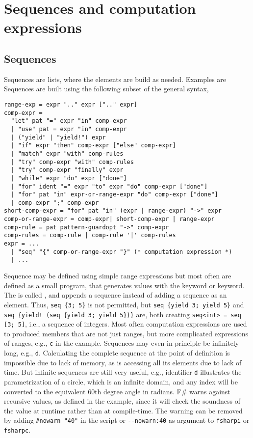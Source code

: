 \documentclass[fsharpNotes.tex]{subfiles}
\begin{document}
\chapter{Sequences and computation expressions}
\label{chap:sequences}
\section{Sequences}
\label{sec:sequences}
Sequences are lists, where the elements are build as needed. Examples are
%
%
Sequences are built using the following subset of the general syntax,
\begin{lstlisting}[language=ebnf]
range-exp = expr ".." expr [".." expr]
comp-expr =
  "let" pat "=" expr "in" comp-expr
  | "use" pat = expr "in" comp-expr
  | ("yield" | "yield!") expr
  | "if" expr "then" comp-expr ["else" comp-expr]
  | "match" expr "with" comp-rules
  | "try" comp-expr "with" comp-rules
  | "try" comp-expr "finally" expr
  | "while" expr "do" expr ["done"]
  | "for" ident "=" expr "to" expr "do" comp-expr ["done"]
  | "for" pat "in" expr-or-range-expr "do" comp-expr ["done"]
  | comp-expr ";" comp-expr
short-comp-expr = "for" pat "in" (expr | range-expr) "->" expr
comp-or-range-expr = comp-expr| short-comp-expr | range-expr
comp-rule = pat pattern-guardopt "->" comp-expr
comp-rules = comp-rule | comp-rule '|' comp-rules
expr = ... 
  | "seq" "{" comp-or-range-expr "}" (* computation expression *)
  | ...
\end{lstlisting}
%
Sequence may be defined using simple range expressions but most often are defined as a small program, that generates values with the  keyword or  keyword. The  is called , and appends a sequence instead of adding a sequence as an element. Thus, \lstinline!seq {3; 5}! is not permitted, but \lstinline!seq {yield 3; yield 5}! and \lstinline|seq {yield! (seq {yield 3; yield 5})}| are, both creating \lstinline!seq<int> = seq [3; 5]!, i.e., a sequence of integers. Most often computation expressions are used to produced members that are not just ranges, but more complicated expressions of ranges, e.g., \lstinline!c! in the example. Sequences may even in principle be infinitely long, e.g., \lstinline!d!. Calculating the complete sequence at the point of definition is impossible due to lack of memory, as is accessing all its elements due to lack of time. But infinite sequences are still very useful, e.g., identifier \lstinline!d! illustrates the parametrization of a circle, which is an infinite domain, and any index will be converted to the equivalent 60th degree angle in radians. F\# warns against recursive values, as defined in the example, since it will check the soundness of the value at runtime rather than at compile-time. The warning can be removed by adding \lstinline!#nowarn "40"! in the script or \lstinline!--nowarn:40! as argument to \lstinline[language=console]!fsharpi! or \lstinline[language=console]!fsharpc!.
\end{document}
